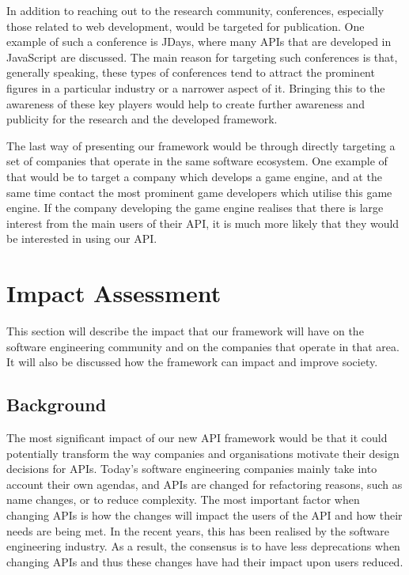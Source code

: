 \documentclass{article}
\begin{document}
In addition to reaching out to the research community, conferences, especially those related to web development, would be targeted for publication. One example of such a conference is JDays, where many APIs that are developed in JavaScript are discussed. The main reason for targeting such conferences is that, generally speaking, these types of conferences tend to attract the prominent figures in a particular industry or a narrower aspect of it. Bringing this to the awareness of these key players would help to create further awareness and publicity for the research and the developed framework.

The last way of presenting our framework would be through directly targeting a set of companies that operate in the same software ecosystem. One example of that would be to target a company which develops a game engine, and at the same time contact the most prominent game developers which utilise this game engine. If the company developing the game engine realises that there is large interest from the main users of their API, it is much more likely that they would be interested in using our API. 


\section{Impact Assessment}
This section will describe the impact that our framework will have on the software engineering community and on the companies that operate in that area. It will also be discussed how the framework can impact and improve society.  

\subsection{Background}
The most significant impact of our new API framework would be that it could potentially transform the way companies and organisations motivate their design decisions for APIs. Today's software engineering companies mainly take into account their own agendas, and APIs are changed for refactoring reasons, such as name changes, or to reduce complexity. The most important factor when changing APIs is how the changes will impact the users of the API and how their needs are being met. In the recent years, this has been realised by the software engineering industry. As a result, the consensus is to have less deprecations when changing APIs and thus these changes have had their impact upon users reduced. 
\end{document}
